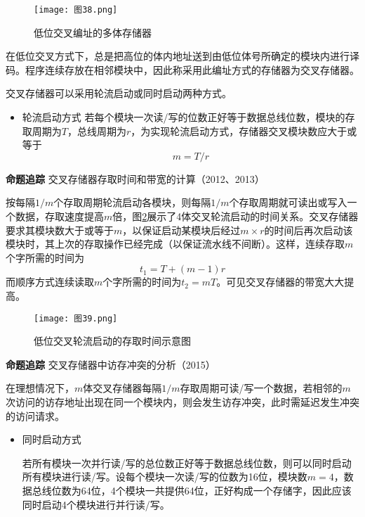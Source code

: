 \documentclass[UTF8]{ctexart}
\begin{document}
	\begin{figure}[h]
		\centering
		\caption{低位交叉编址的多体存储器}
		\label{fig:low_cross_addressing}
		\texttt{[image: 图38.png]} %
	\end{figure}
	在低位交叉方式下，总是把高位的体内地址送到由低位体号所确定的模块内进行译码。程序连续存放在相邻模块中，因此称采用此编址方式的存储器为交叉存储器。
	
	交叉存储器可以采用轮流启动或同时启动两种方式。
	\begin{itemize}
		\item 轮流启动方式
		若每个模块一次读/写的位数正好等于数据总线位数，模块的存取周期为$T$，总线周期为$r$，为实现轮流启动方式，存储器交叉模块数应大于或等于
		\[ m = T/r \]
	\end{itemize}
	
	\begin{tcolorbox}[colframe=black, colback=white]
		\kaishu \textbf{命题追踪} \quad 交叉存储器存取时间和带宽的计算（2012、2013）
	\end{tcolorbox}
	
	按每隔$1/m$个存取周期轮流启动各模块，则每隔$1/m$个存取周期就可读出或写入一个数据，存取速度提高$m$倍，图\ref{fig:low_cross_access_time}展示了4体交叉轮流启动的时间关系。交叉存储器要求其模块数大于或等于$m$，以保证启动某模块后经过$m \times r$的时间后再次启动该模块时，其上次的存取操作已经完成（以保证流水线不间断）。这样，连续存取$m$个字所需的时间为
	\[ t_1 = T + (m - 1)r \]
	而顺序方式连续读取$m$个字所需的时间为$t_2 = mT$。可见交叉存储器的带宽大大提高。
	
	\begin{figure}[h]
		\centering
		\caption{低位交叉轮流启动的存取时间示意图}
		\label{fig:low_cross_access_time}
		\texttt{[image: 图39.png]} %
	\end{figure}
	
	\begin{tcolorbox}[colframe=black, colback=white]
		\kaishu \textbf{命题追踪} \quad 交叉存储器中访存冲突的分析（2015）
	\end{tcolorbox}
	
	在理想情况下，$m$体交叉存储器每隔$1/m$存取周期可读/写一个数据，若相邻的$m$次访问的访存地址出现在同一个模块内，则会发生访存冲突，此时需延迟发生冲突的访问请求。
	
	\begin{itemize}
		\item 同时启动方式
		
		若所有模块一次并行读/写的总位数正好等于数据总线位数，则可以同时启动所有模块进行读/写。设每个模块一次读/写的位数为16位，模块数$m = 4$，数据总线位数为64位，4个模块一共提供64位，正好构成一个存储字，因此应该同时启动4个模块进行并行读/写。
	\end{itemize}
	
\end{document}

